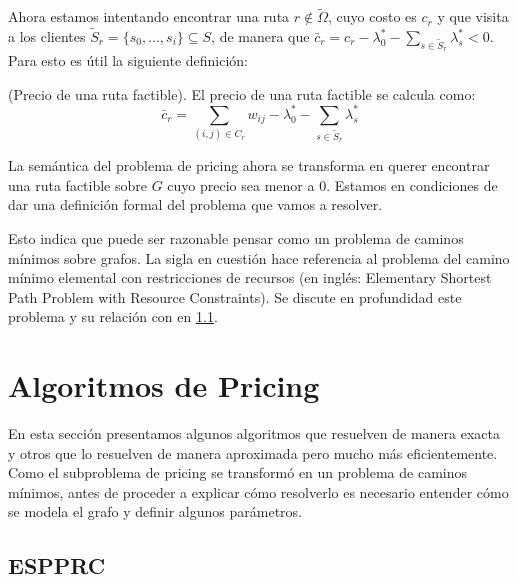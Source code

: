 Ahora estamos intentando encontrar una ruta $r \notin \tilde{\Omega}$, cuyo costo es $c_r$ y que visita a los clientes $\tilde{S}_r = \{s_0, \dots, s_i\} \subseteq S$, de manera que $\bar{c}_r = c_r - \lambda^*_0 - \sum_{s \in \tilde{S}_r}{\lambda^*_s} < 0$. Para esto es útil la siguiente definición:

\begin{definition}
    (Precio de una ruta factible).
    El precio de una ruta factible se calcula como: 
    \begin{equation}
        \bar{c}_r = \sum_{(i, j) \in C_r}{w_{ij}} - \lambda^*_0 - \sum_{s \in \tilde{S}_r}{\lambda^*_s}
    \end{equation}
\end{definition}

La semántica del problema de pricing ahora se transforma en querer encontrar una ruta factible sobre $G$ cuyo precio sea menor a $0$. Estamos en condiciones de dar una definición formal del problema que vamos a resolver. 

\label{star-pricing}

Esto indica que puede ser razonable pensar  como un problema de caminos mínimos sobre grafos. La sigla en cuestión hace referencia al problema del camino mínimo elemental con restricciones de recursos (en inglés: Elementary Shortest Path Problem with Resource Constraints). Se discute en profundidad este problema y su relación con  en \ref{section:espprc}.


\section{Algoritmos de Pricing}
\label{section:pricing-algorithms}

En esta sección presentamos algunos algoritmos que resuelven  de manera exacta y otros que lo resuelven de manera aproximada pero mucho más eficientemente. Como el subproblema de pricing se transformó en un problema de caminos mínimos, antes de proceder a explicar cómo resolverlo es necesario entender cómo se modela el grafo y definir algunos parámetros.


\subsection{ESPPRC}
\label{section:espprc}

